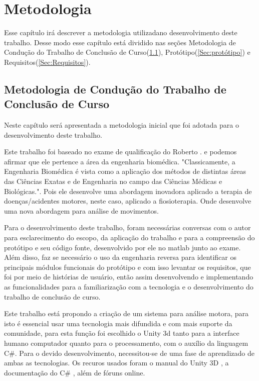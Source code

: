 
\chapter[Metodologia]{Metodologia}
  Esse capítulo irá descrever a metodologia utilizadano desenvolvimento deste trabalho.
Desse modo esse capítulo está dividido nas seções Metodologia de Condução do Trabalho de Conclusão de Curso(\ref{Sec:MetCondTCC}),
Protótipo(\ref{Sec:protótipo}) e Requisitos(\ref{Sec:Requisitos}).
\section{Metodologia de Condução do Trabalho de Conclusão de Curso}
\label{Sec:MetCondTCC}
  Neste capítulo será apresentada a metodologia inicial que foi adotada
para o desenvolvimento deste trabalho.

  Este trabalho foi baseado no exame de qualificação do Roberto \cite{roberto}.
e podemos afirmar que ele pertence a área da engenharia biomédica. "Classicamente,
a Engenharia Biomédica é vista como a aplicação dos métodos de distintas áreas
das Ciências Exatas e de Engenharia no campo das Ciências Médicas e
Biológicas."\cite{engenhariaBiomedica}. Pois ele desenvolve uma abordagem
inovadora aplicado a terapia de  doenças/acidentes motores, neste caso, aplicado a
 fiosioterapia. Onde desenvolve uma nova abordagem para análise de movimentos.

  Para o desenvolvimento deste trabalho, foram necessárias conversas com
o autor para esclarecimento do escopo, da aplicação do trabalho e para a compreensão
do protótipo e seu código fonte, desenvolvido por ele no matlab junto ao exame.
Além disso, faz se necessário o uso da engenharia reversa para identificar os
principais módulos funcionais do protótipo e com isso levantar os requisitos,
que foi por meio de histórias de usuário, então assim desenvolvendo e
implementando as funcionalidades para a familiarização com a tecnologia e o
desenvolvimento do trabalho de conclusão de curso.

   Este trabalho está propondo a criação de um sistema para análise motora,
 para isto é essencial usar uma tecnologia mais difundida e com mais
suporte da comunidade, para esta função foi escolhido o Unity 3d\cite{unity3d} tanto para a interface
humano computador quanto para o processamento, com o auxílio da linguagem C\#.
Para o devido desenvolvimento, necessitou-se de uma fase de aprendizado de ambas
as tecnologias. Os recuros usados foram o manual do Unity 3D \cite{unity3dManual}, a documentação do
C\# \cite{csharpdoc}, além de fóruns online.

